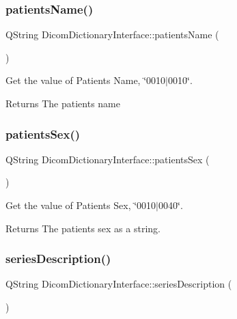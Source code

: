 \subsubsection{\texorpdfstring{patients\+Name()}{patientsName()}}
{\footnotesize\ttfamily Q\+String Dicom\+Dictionary\+Interface\+::patients\+Name (\begin{DoxyParamCaption}{ }\end{DoxyParamCaption})}



Get the value of Patient\textquotesingle{}s Name, \char`\"{}0010$\vert$0010\char`\"{}. 

\begin{DoxyReturn}{Returns}
The patient\textquotesingle{}s name 
\end{DoxyReturn}
\mbox{\label{class_dicom_dictionary_interface_a73afb9037b49ac5e3c6f7e2eebd7d7d9}} 
\subsubsection{\texorpdfstring{patients\+Sex()}{patientsSex()}}
{\footnotesize\ttfamily Q\+String Dicom\+Dictionary\+Interface\+::patients\+Sex (\begin{DoxyParamCaption}{ }\end{DoxyParamCaption})}



Get the value of Patient\textquotesingle{}s Sex, \char`\"{}0010$\vert$0040\char`\"{}. 

\begin{DoxyReturn}{Returns}
The patient\textquotesingle{}s sex as a string. 
\end{DoxyReturn}
\mbox{\label{class_dicom_dictionary_interface_ab083b929999bd78e8428b94dbbe8346a}} 
\subsubsection{\texorpdfstring{series\+Description()}{seriesDescription()}}
{\footnotesize\ttfamily Q\+String Dicom\+Dictionary\+Interface\+::series\+Description (\begin{DoxyParamCaption}{ }\end{DoxyParamCaption})}



